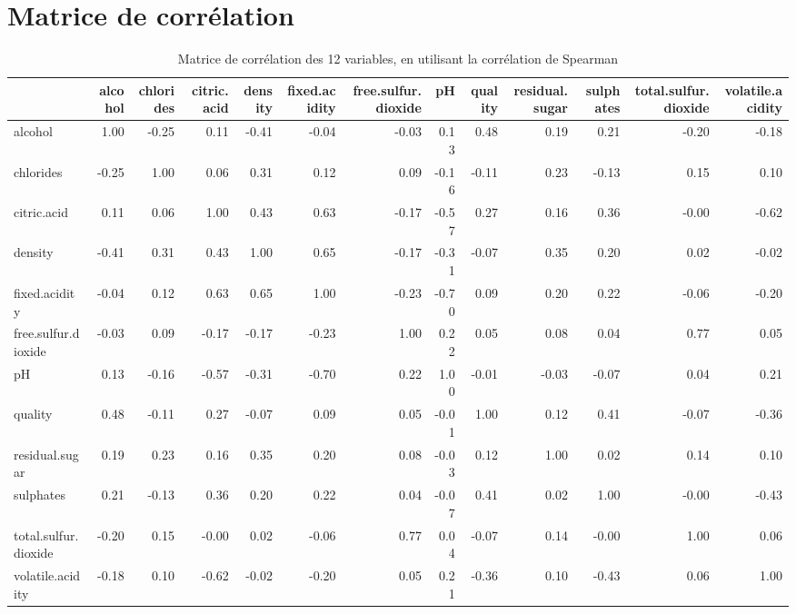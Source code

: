 \documentclass[11pt,a4paper]{article}
\begin{document}
\section{Matrice de corrélation}
\label{sec:cor}
\begin{table}[h]
	\centering
	\begin{adjustbox}{width=1\textwidth}
	\begin{tabular}{lrrrrrrrrrrrr}
		\hline
		& alcohol & chlorides & citric.acid & density & fixed.acidity & free.sulfur.dioxide & pH & quality & residual.sugar & sulphates & total.sulfur.dioxide & volatile.acidity \\ 
		\hline
		alcohol & 1.00 & -0.25 & 0.11 & -0.41 & -0.04 & -0.03 & 0.13 & 0.48 & 0.19 & 0.21 & -0.20 & -0.18 \\ 
		chlorides & -0.25 & 1.00 & 0.06 & 0.31 & 0.12 & 0.09 & -0.16 & -0.11 & 0.23 & -0.13 & 0.15 & 0.10 \\ 
		citric.acid & 0.11 & 0.06 & 1.00 & 0.43 & 0.63 & -0.17 & -0.57 & 0.27 & 0.16 & 0.36 & -0.00 & -0.62 \\ 
		density & -0.41 & 0.31 & 0.43 & 1.00 & 0.65 & -0.17 & -0.31 & -0.07 & 0.35 & 0.20 & 0.02 & -0.02 \\ 
		fixed.acidity & -0.04 & 0.12 & 0.63 & 0.65 & 1.00 & -0.23 & -0.70 & 0.09 & 0.20 & 0.22 & -0.06 & -0.20 \\ 
		free.sulfur.dioxide & -0.03 & 0.09 & -0.17 & -0.17 & -0.23 & 1.00 & 0.22 & 0.05 & 0.08 & 0.04 & 0.77 & 0.05 \\ 
		pH & 0.13 & -0.16 & -0.57 & -0.31 & -0.70 & 0.22 & 1.00 & -0.01 & -0.03 & -0.07 & 0.04 & 0.21 \\ 
		quality & 0.48 & -0.11 & 0.27 & -0.07 & 0.09 & 0.05 & -0.01 & 1.00 & 0.12 & 0.41 & -0.07 & -0.36 \\ 
		residual.sugar & 0.19 & 0.23 & 0.16 & 0.35 & 0.20 & 0.08 & -0.03 & 0.12 & 1.00 & 0.02 & 0.14 & 0.10 \\ 
		sulphates & 0.21 & -0.13 & 0.36 & 0.20 & 0.22 & 0.04 & -0.07 & 0.41 & 0.02 & 1.00 & -0.00 & -0.43 \\ 
		total.sulfur.dioxide & -0.20 & 0.15 & -0.00 & 0.02 & -0.06 & 0.77 & 0.04 & -0.07 & 0.14 & -0.00 & 1.00 & 0.06 \\ 
		volatile.acidity & -0.18 & 0.10 & -0.62 & -0.02 & -0.20 & 0.05 & 0.21 & -0.36 & 0.10 & -0.43 & 0.06 & 1.00 \\ 
		\hline
	\end{tabular}
	\end{adjustbox}
\caption{Matrice de corrélation des 12 variables, en utilisant la corrélation de Spearman}
\label{table:cor}
\end{table}
\FloatBarrier
\end{document}
